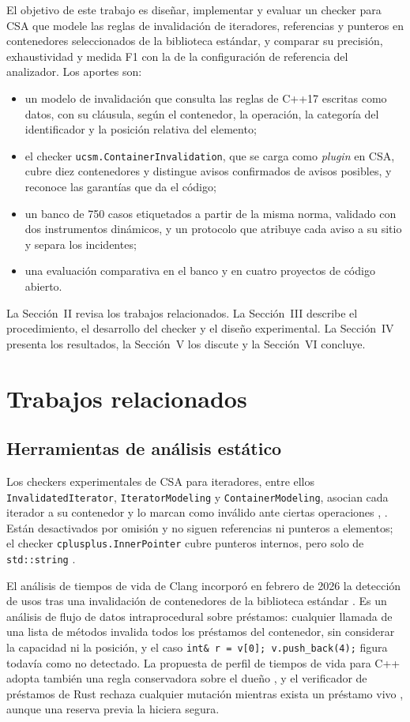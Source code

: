 \documentclass[conference]{IEEEtran}
\newcommand{\code}[1]{\texttt{#1}}
\begin{document}
El objetivo de este trabajo es diseñar, implementar y evaluar un checker para CSA que modele las reglas de invalidación de iteradores, referencias y punteros en contenedores seleccionados de la biblioteca estándar, y comparar su precisión, exhaustividad y medida F1 con la de la configuración de referencia del analizador. Los aportes son:
\begin{itemize}
\item un modelo de invalidación que consulta las reglas de C++17 escritas como datos, con su cláusula, según el contenedor, la operación, la categoría del identificador y la posición relativa del elemento;
\item el checker \code{ucsm.ContainerInvalidation}, que se carga como \textit{plugin} en CSA, cubre diez contenedores y distingue avisos confirmados de avisos posibles, y reconoce las garantías que da el código;
\item un banco de 750 casos etiquetados a partir de la misma norma, validado con dos instrumentos dinámicos, y un protocolo que atribuye cada aviso a su sitio y separa los incidentes;
\item una evaluación comparativa en el banco y en cuatro proyectos de código abierto.
\end{itemize}

La Sección~II revisa los trabajos relacionados. La Sección~III describe el procedimiento, el desarrollo del checker y el diseño experimental. La Sección~IV presenta los resultados, la Sección~V los discute y la Sección~VI concluye.

\section{Trabajos relacionados}

\subsection{Herramientas de análisis estático}

Los checkers experimentales de CSA para iteradores, entre ellos \code{InvalidatedIterator}, \code{IteratorModeling} y \code{ContainerModeling}, asocian cada iterador a su contenedor y lo marcan como inválido ante ciertas operaciones \cite{csadoc}, \cite{balogh18}. Están desactivados por omisión y no siguen referencias ni punteros a elementos; el checker \code{cplusplus.InnerPointer} cubre punteros internos, pero solo de \code{std::string} \cite{csadoc}.

El análisis de tiempos de vida de Clang incorporó en febrero de 2026 la detección de usos tras una invalidación de contenedores de la biblioteca estándar \cite{saxena26}. Es un análisis de flujo de datos intraprocedural sobre préstamos: cualquier llamada de una lista de métodos invalida todos los préstamos del contenedor, sin considerar la capacidad ni la posición, y el caso \code{int\& r = v[0]; v.push\_back(4);} figura todavía como no detectado. La propuesta de perfil de tiempos de vida para C++ adopta también una regla conservadora sobre el dueño \cite{sutter19}, y el verificador de préstamos de Rust rechaza cualquier mutación mientras exista un préstamo vivo \cite{rust23}, aunque una reserva previa la hiciera segura.
\end{document}
